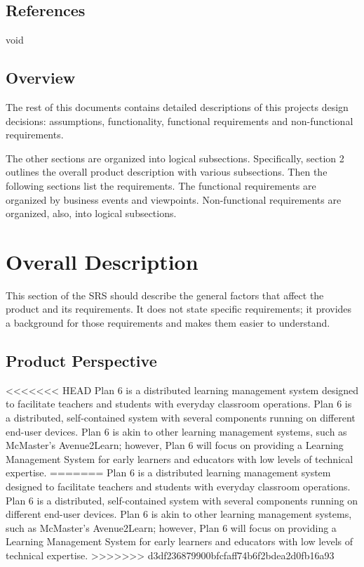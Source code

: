 \documentclass[]{article}
\begin{document}
\subsection{References}
\label{sub:references}
void


\subsection{Overview}
\label{sub:overview}
The rest of this documents contains detailed descriptions of this projects
design decisions: assumptions, functionality, functional requirements and
non-functional requirements.

The other sections are organized into logical subsections. Specifically, section
2 outlines the overall product description with various subsections. Then the
following sections list the requirements. The functional requirements are
organized by business events and viewpoints. Non-functional requirements are
organized, also, into logical subsections.




\section{Overall Description}
\label{sec:overall_description}

This section of the SRS should describe the general factors that affect the
product and its requirements. It does not state specific requirements; it
provides a background for those requirements and makes them easier to
understand.

\subsection{Product Perspective}
\label{sub:product_perspective}
<<<<<<< HEAD
Plan 6 is a distributed learning management system designed to facilitate teachers and students with everyday classroom operations. Plan 6 is a distributed, self-contained system with several components running on different end-user devices. Plan 6 is akin to other learning management systems, such as McMaster's Avenue2Learn; however, Plan 6 will focus on providing a Learning Management System for early learners and educators with low levels of technical expertise.
=======
Plan 6 is a distributed learning management system designed to facilitate
teachers and students with everyday classroom operations. Plan 6 is a
distributed, self-contained system with several components running on different
end-user devices. Plan 6 is akin to other learning management systems, such as
McMaster's Avenue2Learn; however, Plan 6 will focus on providing a Learning
Management System for early learners and educators with low levels of technical
expertise.
>>>>>>> d3df236879900bfcfaff74b6f2bdea2d0fb16a93
\end{document}
